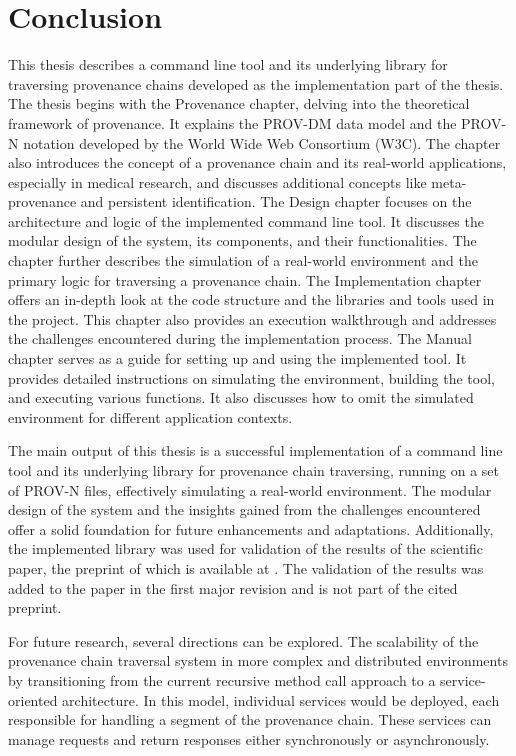 \documentclass[
  digital,     %
  oneside,     %
  nosansbold,  %
  nocolorbold, %
  lof,         %
  lot,         %
]{fithesis4}
\begin{document}
\chapter*{Conclusion}
\shorthandoff{-}
This thesis describes a command line tool and its underlying library for traversing provenance chains developed as the implementation part of the thesis. The thesis begins with the Provenance chapter, delving into the theoretical framework of provenance. It explains the PROV-DM data model and the PROV-N notation developed by the World Wide Web Consortium (W3C). The chapter also introduces the concept of a provenance chain and its real-world applications, especially in medical research, and discusses additional concepts like meta-provenance and persistent identification. The Design chapter focuses on the architecture and logic of the implemented command line tool. It discusses the modular design of the system, its components, and their functionalities. The chapter further describes the simulation of a real-world environment and the primary logic for traversing a provenance chain. The Implementation chapter offers an in-depth look at the code structure and the libraries and tools used in the project. This chapter also provides an execution walkthrough and addresses the challenges encountered during the implementation process. The Manual chapter serves as a guide for setting up and using the implemented tool. It provides detailed instructions on simulating the environment, building the tool, and executing various functions. It also discusses how to omit the simulated environment for different application contexts.

The main output of this thesis is a successful implementation of a command line tool and its underlying library for provenance chain traversing, running on a set of PROV-N files, effectively simulating a real-world environment. The modular design of the system and the insights gained from the challenges encountered offer a solid foundation for future enhancements and adaptations. Additionally, the implemented library was used for validation of the results of the scientific paper, the preprint of which is available at \cite{preprint}. The validation of the results was added to the paper in the first major revision and is not part of the cited preprint.

For future research, several directions can be explored. The scalability of the provenance chain traversal system in more complex and distributed environments by transitioning from the current recursive method call approach to a service-oriented architecture. In this model, individual services would be deployed, each responsible for handling a segment of the provenance chain. These services can manage requests and return responses either synchronously or asynchronously.
\end{document}
